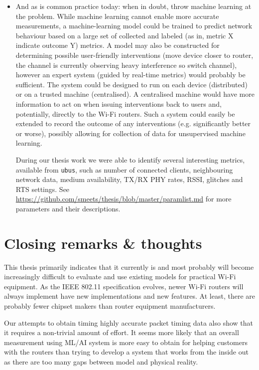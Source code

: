 \begin{itemize}
\item And as is common practice today: when in doubt, throw machine learning
at the problem. While machine learning cannot enable more accurate
measurements, a machine-learning model could be trained to predict network
behaviour based on a large set of collected and labeled (as in, metric X
indicate outcome Y) metrics. A model may also be constructed for determining
possible user-friendly interventions (move device closer to router, the
channel is currently observing heavy interference so switch channel), however
an expert system (guided by real-time metrics) would probably be sufficient.
The system could be designed to run on each device (distributed) or on a
trusted machine (centralised). A centralised machine would have more
information to act on when issuing interventions back to users and,
potentially, directly to the Wi-Fi routers. Such a system could easily be
extended to record the outcome of any interventions (e.g. significantly
better or worse), possibly allowing for collection of data for unsupervised
machine learning.

During our thesis work we were able to identify several interesting metrics, available from \texttt{ubus}, such as number of connected clients, neighbouring
network data, medium availability, TX/RX PHY rates, RSSI, glitches and RTS settings. See \url{https://github.com/smeets/thesis/blob/master/paramlist.md} for more
parameters and their descriptions.


\end{itemize}

\section{Closing remarks \& thoughts}
This thesis primarily indicates that it currently is and most probably will become increasingly difficult to evaluate and use existing
models for practical Wi-Fi equipment. As the IEEE 802.11 specification evolves, newer Wi-Fi routers will always implement have new implementations and new features. At least, there are probably fewer chipset makers than router equipment
manufacturers.

Our attempts to obtain timing highly accurate packet timing data also show
that it requires a non-trivial amount of effort. It seems more likely that 
an overall measurement using ML/AI system is more easy to obtain for helping 
customers with the routers than trying to develop a system that works from the 
inside out as there are too many gaps between model and physical reality.  
